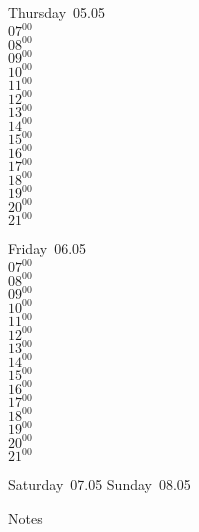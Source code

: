 \documentclass[11pt,a4paper]{book}\usepackage[]{graphicx}\usepackage[]{color}
\begin{document}
\clearpage
\begin{headerbox}
\end{headerbox}
\begin{weekdaybox}
  Thursday~05.05\\
  { 
  \vfill
  $07^{00}$\\
$08^{00}$\\
$09^{00}$\\
$10^{00}$\\
$11^{00}$\\
$12^{00}$\\
$13^{00}$\\
$14^{00}$\\
$15^{00}$\\
$16^{00}$\\
$17^{00}$\\
$18^{00}$\\
$19^{00}$\\
$20^{00}$\\
$21^{00}$\\
  }
\end{weekdaybox} 
\begin{weekdaybox}
  Friday~06.05\\
  { 
  \vfill
  $07^{00}$\\
$08^{00}$\\
$09^{00}$\\
$10^{00}$\\
$11^{00}$\\
$12^{00}$\\
$13^{00}$\\
$14^{00}$\\
$15^{00}$\\
$16^{00}$\\
$17^{00}$\\
$18^{00}$\\
$19^{00}$\\
$20^{00}$\\
$21^{00}$\\
  }
\end{weekdaybox}
\begin{weekendbox}
  Saturday~07.05
  \tcblower
  Sunday~08.05
\end{weekendbox} %
\begin{notebox}
  Notes
\end{notebox}
\clearpage
\end{document}

